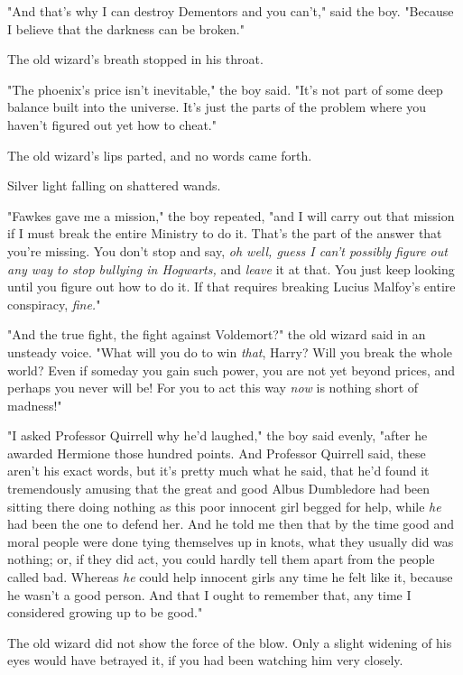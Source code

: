 "And that's why I can destroy Dementors and you can't," said the boy. "Because 
I believe that the darkness can be broken."

The old wizard's breath stopped in his throat.

"The phoenix's price isn't inevitable," the boy said. "It's not part of some 
deep balance built into the universe. It's just the parts of the problem where 
you haven't figured out yet how to cheat."

The old wizard's lips parted, and no words came forth.

Silver light falling on shattered wands.

"Fawkes gave me a mission," the boy repeated, "and I will carry out that 
mission if I must break the entire Ministry to do it. That's the part of the 
answer that you're missing. You don't stop and say, \emph{oh well, guess I 
can't possibly figure out any way to stop bullying in Hogwarts,} and 
\emph{leave} it at that. You just keep looking until you figure out how to do 
it. If that requires breaking Lucius Malfoy's entire conspiracy, \emph{fine.}"

"And the true fight, the fight against Voldemort?" the old wizard said in an 
unsteady voice. "What will you do to win \emph{that}, Harry? Will you break the 
whole world? Even if someday you gain such power, you are not yet beyond 
prices, and perhaps you never will be! For you to act this way \emph{now} is 
nothing short of madness!"

"I asked Professor Quirrell why he'd laughed," the boy said evenly, "after he 
awarded Hermione those hundred points. And Professor Quirrell said, these 
aren't his exact words, but it's pretty much what he said, that he'd found it 
tremendously amusing that the great and good Albus Dumbledore had been sitting 
there doing nothing as this poor innocent girl begged for help, while \emph{he} 
had been the one to defend her. And he told me then that by the time good and 
moral people were done tying themselves up in knots, what they usually did was 
nothing; or, if they did act, you could hardly tell them apart from the people 
called bad. Whereas \emph{he} could help innocent girls any time he felt like 
it, because he wasn't a good person. And that I ought to remember that, any 
time I considered growing up to be good."

The old wizard did not show the force of the blow. Only a slight widening of 
his eyes would have betrayed it, if you had been watching him very closely.

